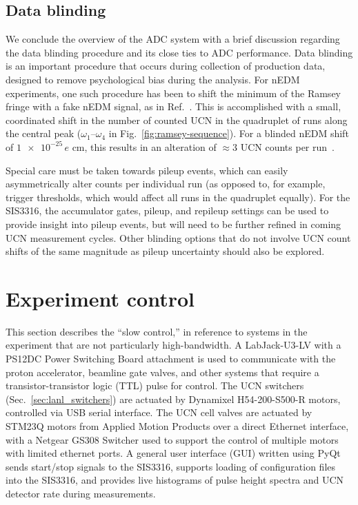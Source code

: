 
\subsection{Data blinding}\label{sec:sis3316_data_blinding}


We conclude the overview of the ADC system with a brief discussion regarding the data blinding procedure and its close ties to ADC performance. Data blinding is an important procedure that occurs during collection of production data, designed to remove psychological bias during the analysis. For nEDM experiments, one such procedure has been to shift the minimum of the Ramsey fringe with a fake nEDM signal, as in Ref.~\cite{Ayres_psi_data_blinding_2021}. This is accomplished with a small, coordinated shift in the number of counted UCN in the quadruplet of runs along the central peak ($\omega_1$--$\omega_4$ in Fig.~\ref{fig:ramsey-sequence}). For a blinded nEDM shift of $\num{1e-25}\,e\text{ cm}$, this results in an alteration of $\approx 3$ UCN counts per run~\cite{Ayres_psi_data_blinding_2021}.

Special care must be taken towards pileup events, which can easily asymmetrically alter counts per individual run (as opposed to, for example, trigger thresholds, which would affect all runs in the quadruplet equally). For the SIS3316, the accumulator gates, pileup, and repileup settings can be used to provide insight into pileup events, but will need to be further refined in coming UCN measurement cycles. Other blinding options that do not involve UCN count shifts of the same magnitude as pileup uncertainty should also be explored.


\section{Experiment control}\label{sec:slow_control}


This section describes the ``slow control,'' in reference to systems in the experiment that are not particularly high-bandwidth. A LabJack-U3-LV with a PS12DC Power Switching Board attachment is used to communicate with the proton accelerator, beamline gate valves, and other systems that require a transistor-transistor logic (TTL) pulse for control. The UCN switchers (Sec.~\ref{sec:lanl_switchers}) are actuated by Dynamixel H54-200-S500-R motors, controlled via USB serial interface. The UCN cell valves are actuated by STM23Q motors from Applied Motion Products over a direct Ethernet interface, with a Netgear GS308 Switcher used to support the control of multiple motors with limited ethernet ports. A general user interface (GUI) written using PyQt sends start/stop signals to the SIS3316, supports loading of configuration files into the SIS3316, and provides live histograms of pulse height spectra and UCN detector rate during measurements. 

